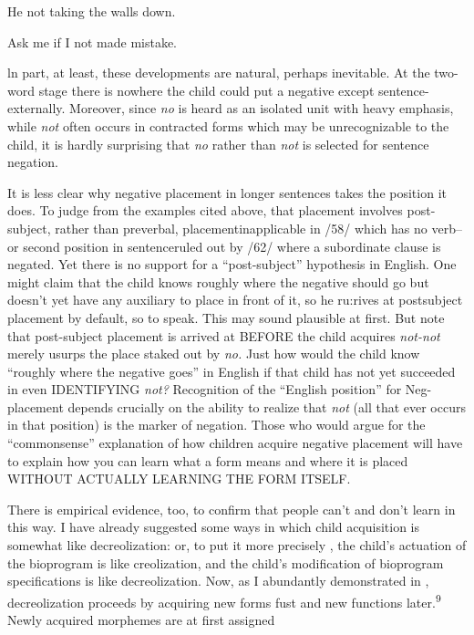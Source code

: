 \ea\label{ex:61}
 He not taking the walls down.
\glt
\z

\ea\label{ex:62}
 Ask me if I not made mistake.
\glt
\z



ln part, at least, these developments are natural, perhaps inevit\-able. At the two-word stage there is nowhere the child could put a negative except sentence-externally. Moreover, since \textit{no} is heard as an isolated unit with heavy emphasis, while \textit{not} often occurs in contracted forms which may be unrecognizable to the child, it is hardly surprising that \textit{no} rather than \textit{not} is selected for sentence negation.

It is less clear why negative placement in longer sentences takes the position it does. To judge from the examples cited above, that placement involves post-subject, rather than preverbal, placement\-inapplicable in /58/ which has no verb--or second position in sentence\-ruled out by /62/ where a subordinate clause is negated. Yet there is no support for a ``post-subject'' hypothesis in English. One might claim that the child knows roughly where the negative should go but doesn't yet have any auxiliary to place in front of it, so he ru:rives at post\-subject placement by default, so to speak. This may sound plausible at first. But note that post-subject placement is arrived at BEFORE the child acquires \textit{not-not} merely usurps the place staked out by \textit{no.} Just how would the child know ``roughly where the negative goes'' in English if that child has not yet succeeded in even IDENTIFYING \textit{not?} Recognition of the ``English position'' for Neg-placement depends crucially on the ability to realize that \textit{not} (all that ever occurs in that position) is the marker of negation. Those who would argue for the ``commonsense'' explanation of how children acquire negative place\-ment will have to explain how you can learn what a form means and where it is placed WITHOUT ACTUALLY LEARNING THE FORM ITSELF.

There is empirical evidence, too, to confirm that people can't and don't learn in this way. I have already suggested some ways in which child acquisition is somewhat like decreolization: or, to put it more precisely , the child's actuation of the bioprogram is like creoliza\-tion, and the child's modification of bioprogram specifications is like decreolization. Now, as I abundantly demonstrated in \citet{Bickerton1975}, decreolization proceeds by acquiring new forms fust and new functions later.\textsuperscript{9 }Newly acquired morphemes are at first assigned


